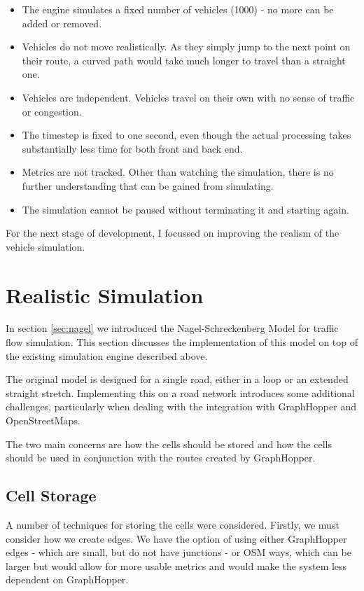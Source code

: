 \documentclass[ %
                    author={Alexander Hill},
                supervisor={Dr. Benjamin Sach},
                    degree={MEng},
                     title={MARMOSET},
                  subtitle={Multi-Agent Route Management using Online Simulation for Efficient Transportation},
                      type={research},
                      year={2016} ]{dissertation}
\begin{document}
\begin{itemize}
    \item The engine simulates a fixed number of vehicles (1000) - no more can
        be added or removed.
    \item Vehicles do not move realistically. As they simply jump to the next
        point on their route, a curved path would take much longer to travel
        than a straight one.
    \item Vehicles are independent. Vehicles travel on their own with no sense
        of traffic or congestion.
    \item The timestep is fixed to one second, even though the actual processing
        takes substantially less time for both front and back end.
    \item Metrics are not tracked. Other than watching the simulation, there is
        no further understanding that can be gained from simulating.
    \item The simulation cannot be paused without terminating it and starting
        again.
\end{itemize}

For the next stage of development, I focussed on improving the realism of the
vehicle simulation.

\section{Realistic Simulation}

In section \ref{sec:nagel} we introduced the Nagel-Schreckenberg Model for
traffic flow simulation. This section discusses the implementation of this model
on top of the existing simulation engine described above.

The original model is designed for a single road, either in a loop or an extended
straight stretch. Implementing this on a road network introduces some additional
challenges, particularly when dealing with the integration with GraphHopper and
OpenStreetMaps.

The two main concerns are how the cells should be stored and how the cells
should be used in conjunction with the routes created by GraphHopper.

\subsection{Cell Storage}

A number of techniques for storing the cells were considered. Firstly, we must
consider how we create edges. We have the option of using either GraphHopper
edges - which are small, but do not have junctions - or OSM ways, which can be
larger but would allow for more usable metrics and would make the system less
dependent on GraphHopper.
\end{document}
